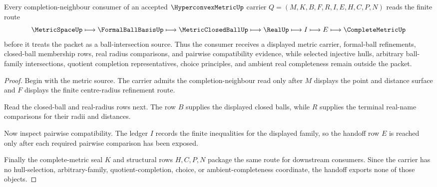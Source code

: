 \begin{theorem}\label{thm:hyperconvex-metric-ball-intersection-handoff}
Every completion-neighbour consumer of an accepted $\HyperconvexMetricUp$ carrier $Q=(M,K,B,F,R,I,E,H,C,P,N)$ reads the finite route
$$
\MetricSpaceUp \longmapsto \FormalBallBasisUp \longmapsto \MetricClosedBallUp \longmapsto \RealUp \longmapsto I \longmapsto E \longmapsto \CompleteMetricUp
$$
before it treats the packet as a ball-intersection source. Thus the consumer receives a displayed metric carrier, formal-ball refinements, closed-ball membership rows, real radius comparisons, and pairwise compatibility evidence, while selected injective hulls, arbitrary ball-family intersections, quotient completion representatives, choice principles, and ambient real completeness remain outside the packet.
\end{theorem}
\begin{proof}
Begin with the metric source. The carrier admits the completion-neighbour read only after $M$ displays the point and distance surface and $F$ displays the finite centre-radius refinement route.

Read the closed-ball and real-radius rows next. The row $B$ supplies the displayed closed balls, while $R$ supplies the terminal real-name comparisons for their radii and distances.

Now inspect pairwise compatibility. The ledger $I$ records the finite inequalities for the displayed family, so the handoff row $E$ is reached only after each required pairwise comparison has been exposed.

Finally the complete-metric seal $K$ and structural rows $H,C,P,N$ package the same route for downstream consumers. Since the carrier has no hull-selection, arbitrary-family, quotient-completion, choice, or ambient-completeness coordinate, the handoff exports none of those objects.
\end{proof}



